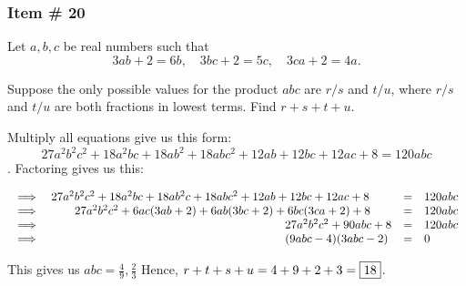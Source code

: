 \documentclass[11pt,paper=letter]{scrartcl}
\begin{document}
\newpage

\subsubsection{Item \# 20}

\begin{probboxed}
Let $a,b,c$ be real numbers such that $$3ab + 2 = 6b, \quad 3bc + 2 = 5c, \quad 3ca + 2 =4a.$$
    
   Suppose the only possible values for the product $abc$ are $r/s$ and $t/u$, where $r/s $ and $t/u$ are both fractions in lowest terms. Find $r+s+t+u.$
\end{probboxed}


\sol

Multiply all equations give us this form: $$27a^2b^2c^2 + 18a^2bc +18ab^2 + 18abc^2 + 12ab + 12bc + 12ac + 8 =120abc$$. Factoring gives us this:

\vspace{-1cm}

\begin{center}
    \begin{equation*}
        \begin{array}{llll}
            \implies & 27a^2b^2c^2 + 18a^2bc +18ab^2c + 18abc^2 + 12ab + 12bc + 12ac + 8 & = & 120abc \\
            
           \implies & \hspace{7mm} 27a^2b^2c^2 + 6ac(3ab +2) + 6ab(3bc+2) + 6bc(3ca +2) + 8 & = & 120abc \\
           
           \implies &  \hspace{7cm} 27a^2b^2c^2 + 90abc + 8 & = & 120abc \\
           
           \implies &  \hspace{7cm}  (9abc -4) (3abc -2) & = & 0\\
        \end{array}
    \end{equation*}
\end{center}

This gives us $abc= \frac{4}{9}, \frac{2}{3} $  Hence, $r+t+s+u = 4 + 9 + 2 + 3 = \fbox{18}$.
\end{document}
